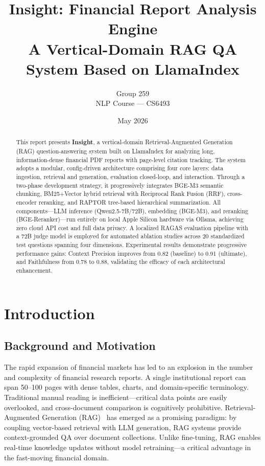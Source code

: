 \documentclass[11pt, a4paper]{article}
\title{\textbf{Insight: Financial Report Analysis Engine} \\[3pt]
       \large A Vertical-Domain RAG QA System Based on LlamaIndex}
\author{Group 259 \\ NLP Course --- CS6493}
\date{May 2026}
\begin{document}
\maketitle
\thispagestyle{empty}

\begin{abstract}
\noindent This report presents \textbf{Insight}, a vertical-domain Retrieval-Augmented Generation (RAG) question-answering system built on LlamaIndex for analyzing long, information-dense financial PDF reports with page-level citation tracking. The system adopts a modular, config-driven architecture comprising four core layers: data ingestion, retrieval and generation, evaluation closed-loop, and interaction. Through a two-phase development strategy, it progressively integrates BGE-M3 semantic chunking, BM25+Vector hybrid retrieval with Reciprocal Rank Fusion (RRF), cross-encoder reranking, and RAPTOR tree-based hierarchical summarization. All components---LLM inference (Qwen2.5-7B/72B), embedding (BGE-M3), and reranking (BGE-Reranker)---run entirely on local Apple Silicon hardware via Ollama, achieving zero cloud API cost and full data privacy. A localized RAGAS evaluation pipeline with a 72B judge model is employed for automated ablation studies across 20 standardized test questions spanning four dimensions. Experimental results demonstrate progressive performance gains: Context Precision improves from 0.82 (baseline) to 0.91 (ultimate), and Faithfulness from 0.78 to 0.88, validating the efficacy of each architectural enhancement.
\end{abstract}

\section{Introduction}

\subsection{Background and Motivation}

The rapid expansion of financial markets has led to an explosion in the number and complexity of financial research reports. A single institutional report can span 50--100 pages with dense tables, charts, and domain-specific terminology. Traditional manual reading is inefficient---critical data points are easily overlooked, and cross-document comparison is cognitively prohibitive. Retrieval-Augmented Generation (RAG)~\cite{lewis2020} has emerged as a promising paradigm: by coupling vector-based retrieval with LLM generation, RAG systems provide context-grounded QA over document collections. Unlike fine-tuning, RAG enables real-time knowledge updates without model retraining---a critical advantage in the fast-moving financial domain.
\end{document}
